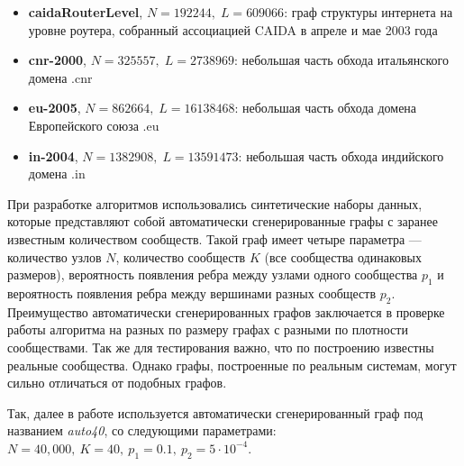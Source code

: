 \begin{itemize}
	\item \textbf{caidaRouterLevel}, $N = 192244,\;L =  609066$: граф структуры интернета на уровне роутера, собранный ассоциацией CAIDA в апреле и мае 2003 года
	\item \textbf{cnr-2000}, $N = 325557,\;L = 2738969$: небольшая часть обхода итальянского домена .cnr \cite{Boldi&Vigna:2004, Boldi&al:2011, Boldi&al:2004}
	\item \textbf{eu-2005}, $N = 862664,\;L = 16138468$: небольшая часть обхода домена Европейского союза .eu \cite{Boldi&Vigna:2004, Boldi&al:2011, Boldi&al:2004}
	\item \textbf{in-2004}, $N = 1382908,\;L = 13591473$: небольшая часть обхода индийского домена .in \cite{Boldi&Vigna:2004, Boldi&al:2011, Boldi&al:2004}

\end{itemize}

При разработке алгоритмов использовались синтетические наборы данных, которые представляют собой автоматически сгенерированные графы с заранее известным количеством сообществ. Такой граф имеет четыре параметра --- количество узлов $N$, количество сообществ $K$ (все сообщества одинаковых размеров), вероятность появления ребра между узлами одного сообщества $p_1$ и вероятность появления ребра между вершинами разных сообществ $p_2$. Преимущество автоматически сгенерированных графов заключается в проверке работы алгоритма на разных по размеру графах с разными по плотности сообществами. Так же для тестирования важно, что по построению известны реальные сообщества. Однако графы, построенные по реальным системам, могут сильно отличаться от подобных графов.

Так, далее в работе используется автоматически сгенерированный граф под названием \emph{auto40}, со следующими параметрами: $N = 40,000,\ K = 40,\ p_1 = 0.1,\ p_2 = 5\cdot 10^{-4}$.